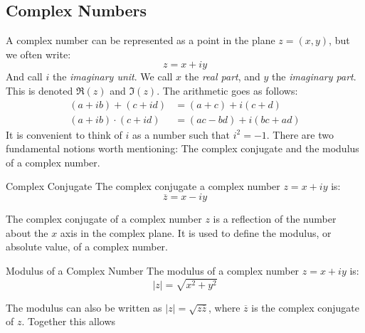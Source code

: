 \documentclass[crop=false,class=book,oneside]{standalone}
\begin{document}
        \subsection{Complex Numbers}
            A complex number can be represented as a point in the plane $z=(x,y)$,
            but we often write:
            \begin{equation}
                z=x+iy
            \end{equation}
            And call $i$ the \textit{imaginary unit}.
            We call $x$ the \textit{real part}, and
            $y$ the \textit{imaginary part}. This is
            denoted $\Re(z)$ and $\Im(z)$. The arithmetic
            goes as follows:
            \begin{subequations}
                \begin{align}
                    (a+ib)+(c+id)&=(a+c)+i(c+d)\\
                    (a+ib)\cdot(c+id)&=(ac-bd)+i(bc+ad)
                \end{align}
            \end{subequations}
            It is convenient to think of $i$ as a number
            such that $i^{2}=-1$. There are two fundamental
            notions worth mentioning: The complex conjugate
            and the modulus of a complex number.
            \begin{ldefinition}{Complex Conjugate}
                The complex conjugate a complex number
                $z=x+iy$ is:
                \begin{equation}
                    \overline{z}=x-iy
                \end{equation}
            \end{ldefinition}
            The complex conjugate of a complex number $z$
            is a reflection of the number about the
            $x$ axis in the complex plane. It is used to
            define the modulus, or absolute value, of
            a complex number.
            \begin{ldefinition}{Modulus of a Complex Number}
                The modulus of a complex number $z=x+iy$ is:
                \begin{equation}
                    |z|=\sqrt{x^{2}+y^{2}}
                \end{equation}
            \end{ldefinition}
            The modulus can also be written as
            $|z|=\sqrt{z\overline{z}}$, where $\overline{z}$
            is the complex conjugate of $z$. Together this allows
\end{document}
